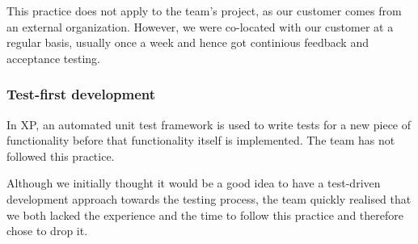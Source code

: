 This practice does not apply to the team's project, as our customer comes from an external organization. However, we were co-located with our customer at a regular basis, usually once a week and hence got continious feedback and acceptance testing.

\subsubsection{Test-first development}
In XP, an automated unit test framework is used to write tests for a new piece of functionality before that functionality itself is implemented. The team has not followed this practice.

Although we initially thought it would be a good idea to have a test-driven development approach towards the testing process, the team quickly realised that we both lacked the experience and the time to follow this practice and therefore chose to drop it.